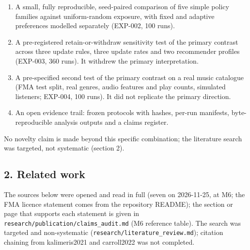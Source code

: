 \documentclass[
]{article}
\providecommand{\tightlist}{%
  \setlength{\itemsep}{0pt}\setlength{\parskip}{0pt}}
\begin{document}
\begin{enumerate}
\def\labelenumi{\arabic{enumi}.}
\tightlist
\item
  A small, fully reproducible, seed-paired comparison of five simple
  policy families against uniform-random exposure, with fixed and
  adaptive preferences modelled separately (EXP-002, 100 runs).
\item
  A pre-registered retain-or-withdraw sensitivity test of the primary
  contrast across three update rules, three update rates and two
  recommender profiles (EXP-003, 360 runs). It withdrew the primary
  interpretation.
\item
  A pre-specified second test of the primary contrast on a real music
  catalogue (FMA test split, real genres, audio features and play
  counts, simulated listeners; EXP-004, 100 runs). It did not replicate
  the primary direction.
\item
  An open evidence trail: frozen protocols with hashes, per-run
  manifests, byte-reproducible analysis outputs and a claims register.
\end{enumerate}

No novelty claim is made beyond this specific combination; the
literature search was targeted, not systematic (section 2).

\subsection{2. Related work}\label{related-work}

The sources below were opened and read in full (seven on 2026-11-25, at
M6; the FMA licence statement comes from the repository README); the
section or page that supports each statement is given in
\texttt{research/publication/claims\_audit.md} (M6 reference table). The
search was targeted and non-systematic
(\texttt{research/literature\_review.md}); citation chaining from
kalimeris2021 and carroll2022 was not completed.
\end{document}
